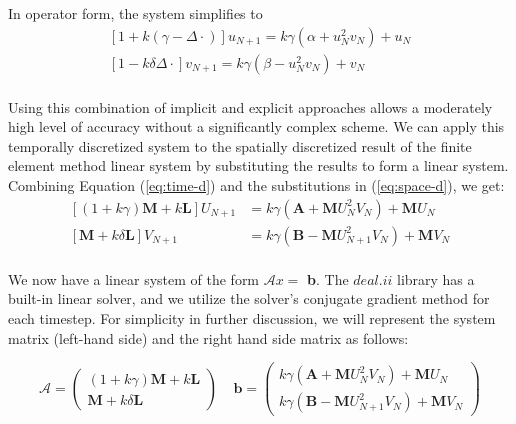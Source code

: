 \documentclass[12pt]{article}
\begin{document}
\noindent In operator form, the system simplifies to
\begin{equation}\label{eq:time-d}
\begin{aligned}
\left[1 + k\left(\gamma - \Delta\cdot\right)\right]u_{N+1}=  k\gamma\left(\alpha + u_{N}^2v_{N} \right) + u_{N} \\
\left[1 - k\delta\Delta\cdot\right] v_{N+1}=  k\gamma\left(\beta - u_{N}^2v_{N} \right) + v_{N} \\
\end{aligned}
\end{equation}

Using this combination of implicit and explicit approaches allows a moderately high level of accuracy without a significantly complex scheme. We can apply this temporally discretized system to the spatially discretized result of the finite element method linear system by substituting the results to form a linear system. Combining Equation (\ref{eq:time-d}) and the substitutions in (\ref{eq:space-d}), we get:
\begin{equation}
\begin{aligned}
\left[(1+k\gamma)\textbf{M} + k\textbf{L}\right] U_{N+1}&=  k\gamma\left(\textbf{A} + \textbf{M} U^2_{N}V_{N} \right) + \textbf{M}U_{N} \\
\left[\textbf{M} + k\delta\textbf{L}\right] V_{N+1}&=  k\gamma\left(\textbf{B} - \textbf{M} U^2_{N+1}V_{N} \right) + \textbf{M}V_{N} \\
\end{aligned}
\end{equation}

We now have a linear system of the form $\mathcal{A}x=$ \textbf{b}. The $deal.ii$ library has a built-in linear solver, and we utilize the solver's conjugate gradient method for each timestep. For simplicity in further discussion, we will represent the system matrix (left-hand side) and the right hand side matrix as follows:

\begin{equation}
	\mathcal{A} = \left(\begin{matrix} 
	(1+k\gamma)\textbf{M} + k\textbf{L} \\ 
	\textbf{M} + k\delta\textbf{L}
	\end{matrix}\right) ~~~~~
	\textbf{b} = \left(\begin{matrix} 
	k\gamma\left(\textbf{A} + \textbf{M} U^2_{N}V_{N} \right) + \textbf{M}U_{N} \\ 
	k\gamma\left(\textbf{B} - \textbf{M} U^2_{N+1}V_{N} \right) + \textbf{M}V_{N}
	\end{matrix}\right)
\end{equation} 
\end{document}
